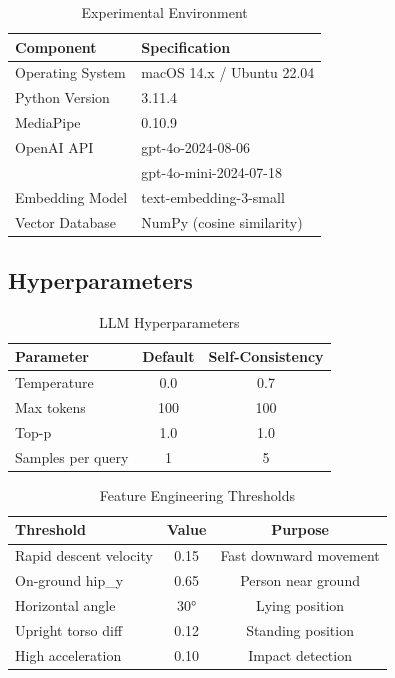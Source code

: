 \documentclass[conference]{IEEEtran}
\begin{document}
\begin{table}[H]
\centering
\caption{Experimental Environment}
\label{tab:environment}
\begin{tabular}{ll}
\toprule
\textbf{Component} & \textbf{Specification} \\
\midrule
Operating System & macOS 14.x / Ubuntu 22.04 \\
Python Version & 3.11.4 \\
MediaPipe & 0.10.9 \\
OpenAI API & gpt-4o-2024-08-06 \\
 & gpt-4o-mini-2024-07-18 \\
Embedding Model & text-embedding-3-small \\
Vector Database & NumPy (cosine similarity) \\
\bottomrule
\end{tabular}
\end{table}

\subsection{Hyperparameters}

\begin{table}[H]
\centering
\caption{LLM Hyperparameters}
\label{tab:hyperparams}
\begin{tabular}{lcc}
\toprule
\textbf{Parameter} & \textbf{Default} & \textbf{Self-Consistency} \\
\midrule
Temperature & 0.0 & 0.7 \\
Max tokens & 100 & 100 \\
Top-p & 1.0 & 1.0 \\
Samples per query & 1 & 5 \\
\bottomrule
\end{tabular}
\end{table}

\begin{table}[H]
\centering
\caption{Feature Engineering Thresholds}
\label{tab:thresholds}
\begin{tabular}{lcc}
\toprule
\textbf{Threshold} & \textbf{Value} & \textbf{Purpose} \\
\midrule
Rapid descent velocity & 0.15 & Fast downward movement \\
On-ground hip\_y & 0.65 & Person near ground \\
Horizontal angle & 30° & Lying position \\
Upright torso diff & 0.12 & Standing position \\
High acceleration & 0.10 & Impact detection \\
\bottomrule
\end{tabular}
\end{table}
\end{document}
